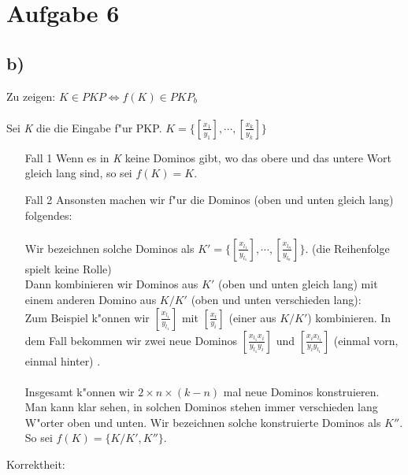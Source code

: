 \documentclass[a4paper,11pt]{scrartcl}
\begin{document}
\section*{Aufgabe 6}

\subsection*{b)}
	Zu zeigen: $K\in PKP \iff f(K) \in PKP_b$
	\\ \ \\
	Sei \textit{K} die die Eingabe f"ur PKP. $K =\Big\{ \left[ \frac{x_1}{y_1}  \right] ,\cdots , \left[ \frac{x_k}{y_k}  \right] \Big\} $
	\begin{itemize}
		\item [Fall 1] Wenn es in \textit{K} keine Dominos gibt, wo das obere und das untere Wort gleich lang sind, so sei $f(K)=K$.
		\item [Fall 2] Ansonsten machen wir f"ur die Dominos (oben und unten gleich lang) folgendes:\\ \ \\
		Wir bezeichnen solche Dominos als $K'=\big\{  \left[ \frac{x_{l_{1}}}{y_{l_{1}}} \right], \cdots ,\left[ \frac{x_{l_{n}}}{y_{l_{n}}} \right] \big\}$. (die Reihenfolge spielt keine Rolle)\\
		Dann kombinieren wir Dominos aus $K'$ \textcolor{rwth-blue}{(oben und unten gleich lang)} mit einem anderen Domino aus $K/K'$ \textcolor{rwth-blue}{ (oben und unten verschieden lang)}:\\
		Zum Beispiel k"onnen wir  $\left[ \frac{x_{l_{1}}}{y_{l_{1}}} \right]$ mit $\left[ \frac{x_i}{y_i}  \right]$ (einer aus $K/K'$) kombinieren. In dem Fall bekommen wir zwei neue Dominos $\left[ \frac{x_{l_{1}} x_i}{y_{l_{1}} y_i} \right]$ und $\left[ \frac{x_i x_{l_{1}}}{y_i y_{l_{1}}} \right]$ \textcolor{rwth-blue}{ (einmal vorn, einmal hinter) }.
		\\ \ \\
		Insgesamt k"onnen wir $2 \times n \times (k-n)$ mal neue Dominos konstruieren. Man kann klar sehen, in solchen Dominos stehen immer verschieden lang W"orter oben und unten. Wir bezeichnen solche konstruierte Dominos als $K''$. So sei $f(K) = \{ K/K', K''\} $.
	\end{itemize}  
	
	
	\noindent Korrektheit:\\
	
\end{document}
